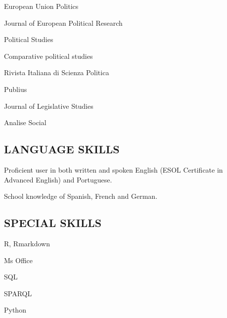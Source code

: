 \documentclass[11pt,]{article}
\providecommand{\tightlist}{%
  \setlength{\itemsep}{0pt}\setlength{\parskip}{0pt}}
\renewenvironment{itemize}{
  \begin{list}{}{
    \setlength{\leftmargin}{1.5em}
  }
}{
  \end{list}
}
\begin{document}
\begin{itemize}
\tightlist
\item
  European Union Politics\\
\item
  Journal of European Political Research\\
\item
  Political Studies\\
\item
  Comparative political studies\\
\item
  Rivista Italiana di Scienza Politica\\
\item
  Publius\\
\item
  Journal of Legislative Studies\\
\item
  Analise Social
\end{itemize}

\hypertarget{language-skills}{%
\subsection{LANGUAGE SKILLS}\label{language-skills}}

\begin{itemize}
\tightlist
\item
  Proficient user in both written and spoken English (ESOL Certificate
  in Advanced English) and Portuguese.
\item
  School knowledge of Spanish, French and German.
\end{itemize}

\hypertarget{special-skills}{%
\subsection{SPECIAL SKILLS}\label{special-skills}}

\begin{itemize}
\tightlist
\item
  R, Rmarkdown
\item
  Ms Office
\item
  SQL
\item
  SPARQL
\item
  Python
\end{itemize}
\end{document}
